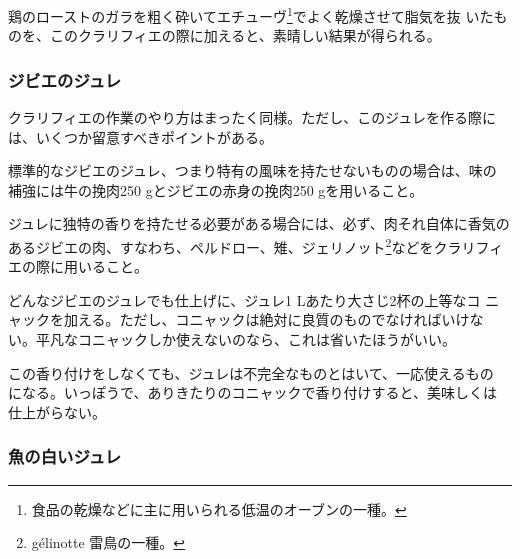 \begin{recette}
鶏のローストのガラを粗く砕いてエチューヴ\footnote{食品の乾燥などに主に用いられる低温のオーブンの一種。}でよく乾燥させて脂気を抜
いたものを、このクラリフィエの際に加えると、素晴しい結果が得られる。

\maeaki

\hypertarget{gelee-de-gibier}{%
\subsubsection{ジビエのジュレ}\label{gelee-de-gibier}}



クラリフィエの作業のやり方はまったく同様。ただし、このジュレを作る際に
は、いくつか留意すべきポイントがある。

標準的なジビエのジュレ、つまり特有の風味を持たせないものの場合は、味の
補強には牛の挽肉250 gとジビエの赤身の挽肉250 gを用いること。

ジュレに独特の香りを持たせる必要がある場合には、必ず、肉それ自体に香気のあるジビエの肉、すなわち、ペルドロー、雉、ジェリノット\footnote{gélinotte
  雷鳥の一種。}などをクラリフィエの際に用いること。

どんなジビエのジュレでも仕上げに、ジュレ1 Lあたり大さじ2杯の上等なコ
ニャックを加える。ただし、コニャックは絶対に良質のものでなければいけな
い。平凡なコニャックしか使えないのなら、これは省いたほうがいい。

この香り付けをしなくても、ジュレは不完全なものとはいて、一応使えるもの
になる。いっぽうで、ありきたりのコニャックで香り付けすると、美味しくは
仕上がらない。

\maeaki

\hypertarget{gelee-de-poisson-blanche}{%
\subsubsection{魚の白いジュレ}\label{gelee-de-poisson-blanche}}




\end{recette}
